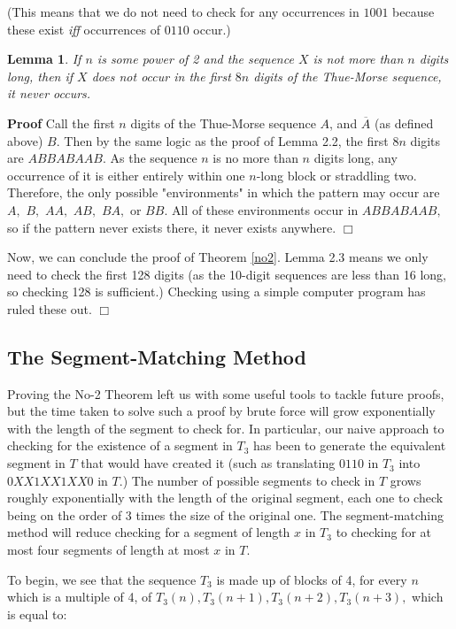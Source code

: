 \documentclass{article}
\newtheorem{lemma}{Lemma}[section]
\begin{document}
(This means that we do not need to check for any occurrences in $1001$ because these exist \emph{iff} occurrences of $0110$ occur.)

\begin{lemma}
\label{recurrence}
If $n$ is some power of 2 and the sequence $X$ is not more than $n$ digits long, then if $X$ does not occur in the first $8n$ digits of the Thue-Morse sequence, it never occurs.
\end{lemma}

\textbf{Proof} Call the first $n$ digits of the Thue-Morse sequence $A$, and $\overline{A}$ (as defined above) $B.$ Then by the same logic as the proof of Lemma 2.2, the first $8n$ digits are $ABBABAAB.$ As the sequence $n$ is no more than $n$ digits long, any occurrence of it is either entirely within one $n$-long block or straddling two. Therefore, the only possible "environments" in which the pattern may occur are $A,$ $B,$ $AA,$ $AB,$ $BA,$ or $BB.$ All of these environments occur in $ABBABAAB,$ so if the pattern never exists there, it never exists anywhere. $\Box$

Now, we can conclude the proof of Theorem \ref{no2}. Lemma 2.3 means we only need to check the first 128 digits (as the 10-digit sequences are less than 16 long, so checking 128 is sufficient.) Checking using a simple computer program has ruled these out. $\Box$

\subsection{The Segment-Matching Method}

Proving the No-2 Theorem left us with some useful tools to tackle future proofs, but the time taken to solve such a proof by brute force will grow exponentially with the length of the segment to check for. In particular, our naive approach to checking for the existence of a segment in $T_3$ has been to generate the equivalent segment in $T$ that would have created it (such as translating $0110$ in $T_3$ into $0XX1XX1XX0$ in $T$.) The number of possible segments to check in $T$ grows roughly exponentially with the length of the original segment, each one to check being on the order of 3 times the size of the original one. The segment-matching method will reduce checking for a segment of length $x$ in $T_3$ to checking for at most four segments of length at most $x$ in $T.$

To begin, we see that the sequence $T_3$ is made up of blocks of 4, for every $n$ which is a multiple of 4, of $T_3(n), T_3(n+1), T_3(n+2), T_3(n+3),$ which is equal to:
\end{document}
